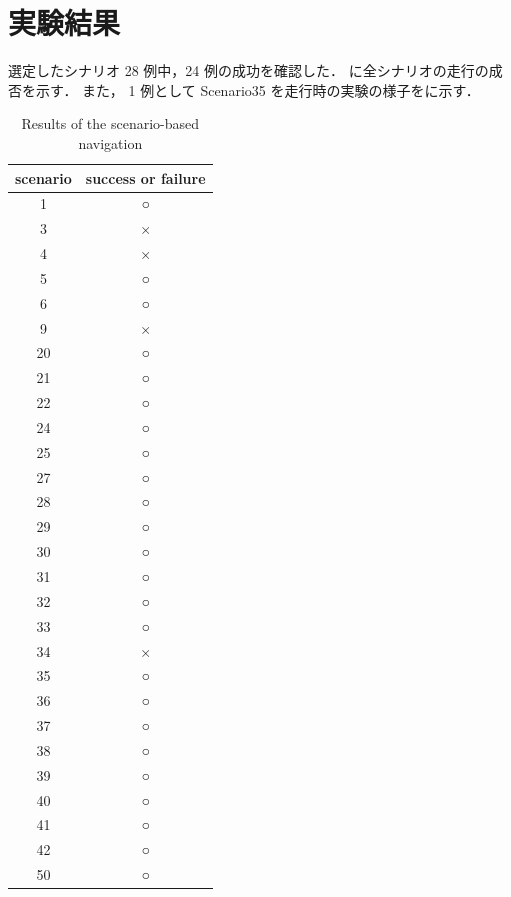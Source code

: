 \newpage
\section{実験結果}
選定したシナリオ 28 例中，24 例の成功を確認した．
に全シナリオの走行の成否を示す．
また， 1 例として Scenario35 を走行時の実験の様子をに示す．

\begin{table}[]
    \centering
    \caption{Results of the scenario-based navigation}\label{tab:scenario_result}
    \begin{tabular}{|c|c|}
    \hline
    scenario & success or failure \\ \hline
    1        & ○                  \\ \hline
    3        & ×                  \\ \hline
    4        & ×                  \\ \hline
    5        & ○                  \\ \hline
    6        & ○                  \\ \hline
    9        & ×                  \\ \hline
    20       & ○                  \\ \hline
    21       & ○                  \\ \hline
    22       & ○                  \\ \hline
    24       & ○                  \\ \hline
    25       & ○                  \\ \hline
    27       & ○                  \\ \hline
    28       & ○                  \\ \hline
    29       & ○                  \\ \hline
    30       & ○                  \\ \hline
    31       & ○                  \\ \hline
    32       & ○                  \\ \hline
    33       & ○                  \\ \hline
    34       & ×                  \\ \hline
    35       & ○                  \\ \hline
    36       & ○                  \\ \hline
    37       & ○                  \\ \hline
    38       & ○                  \\ \hline
    39       & ○                  \\ \hline
    40       & ○                  \\ \hline
    41       & ○                  \\ \hline
    42       & ○                  \\ \hline
    50       & ○                  \\ \hline
    \end{tabular}
\end{table}

